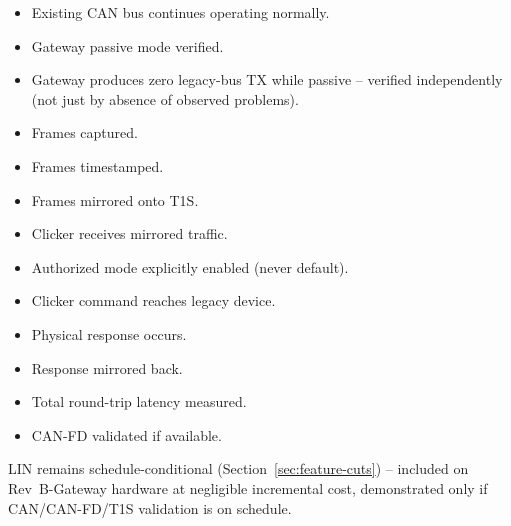 \begin{itemize}[itemsep=0.1em, label={$\square$}]
\item Existing CAN bus continues operating normally.
\item Gateway passive mode verified.
\item Gateway produces zero legacy-bus TX while passive -- verified independently (not just by absence of observed problems).
\item Frames captured.
\item Frames timestamped.
\item Frames mirrored onto T1S.
\item Clicker receives mirrored traffic.
\item Authorized mode explicitly enabled (never default).
\item Clicker command reaches legacy device.
\item Physical response occurs.
\item Response mirrored back.
\item Total round-trip latency measured.
\item CAN-FD validated if available.
\end{itemize}

LIN remains schedule-conditional (Section~\ref{sec:feature-cuts}) -- included on Rev~B-Gateway hardware at negligible incremental cost, demonstrated only if CAN/CAN-FD/T1S validation is on schedule.
